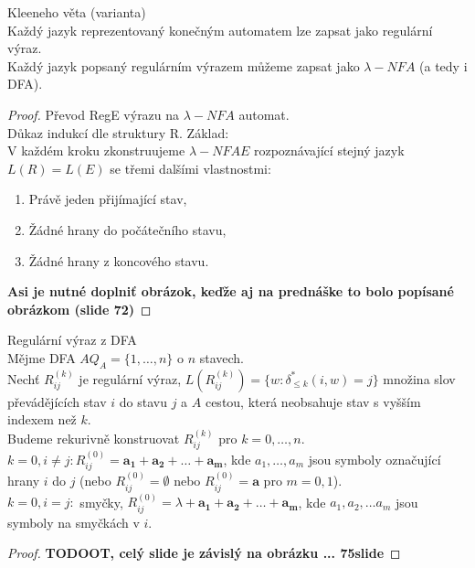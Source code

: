 \documentclass[../main.tex]{subfiles}
\begin{document}
\begin{theorem}
    Kleeneho věta (varianta)\\

    Každý jazyk reprezentovaný konečným automatem lze zapsat jako regulární výraz.\\
    Každý jazyk popsaný regulárním výrazem můžeme zapsat jako $\lambda -NFA$ (a tedy i DFA).

    \begin{proof}
        Převod RegE výrazu na $\lambda -NFA$ automat.\\

        Důkaz indukcí dle struktury R. Základ:\\

        V každém kroku zkonstruujeme $\lambda - NFA E$ rozpoznávající stejný jazyk $L(R) = L(E)$ se třemi dalšími vlastnostmi:
        \begin{enumerate}
            \item Právě jeden přijímající stav,
            \item Žádné hrany do počátečního stavu,
            \item Žádné hrany z koncového stavu.
        \end{enumerate}
        \textbf{Asi je nutné doplniť obrázok, keďže aj na prednáške to bolo popísané obrázkom (slide 72)}
    \end{proof}
\end{theorem}

\begin{definition}
    Regulární výraz z DFA\\

    Mějme DFA $A Q_A = \{1,\dots,n\}$ o $n$ stavech.\\
    Nechť $R^(k)_{ij}$ je regulární výraz, $L(R^(k)_{ij}) = \{w : \delta^*_{\leq k}(i,w) = j\}$ množina slov
    převádějících stav $i$ do stavu $j$ a $A$ cestou, která neobsahuje stav s vyšším indexem než $k$.\\
    Budeme rekurivně konstruovat $R^(k)_{ij}$ pro $k = 0,\dots, n$.\\
    $k = 0, i\neq j : R^(0)_{ij} = \mathbf{a_1} + \mathbf{a_2} + \dots + \mathbf{a_m}$, kde $a_1, \dots, a_m$ jsou
    symboly označující hrany $i$ do $j$ (nebo $R^(0)_{ij} = \emptyset$ nebo $R^(0)_{ij} = \mathbf{a}$ pro $m = 0,1$).\\
    $k = 0, i = j: $ smyčky, $R^(0)_{ij} = \lambda + \mathbf{a_1} + \mathbf{a_2} +\dots + \mathbf{a_m}$, kde 
    $a_1, a_2,\dots a_m$ jsou symboly na smyčkách v $i$.
\end{definition}
\begin{proof}
    \textbf{TODOOT, celý slide je závislý na obrázku ... 75slide}
\end{proof}
\end{document}

